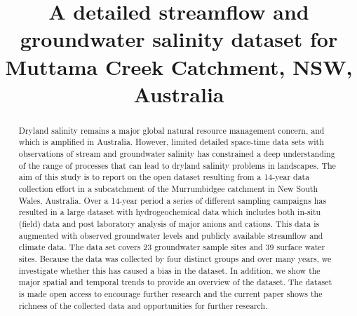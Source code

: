 \documentclass[, manuscript]{copernicus}
\begin{document}
\title{A detailed streamflow and groundwater salinity dataset for
Muttama Creek Catchment, NSW, Australia}











\received{}
\pubdiscuss{} %
\revised{}
\accepted{}
\published{}




\maketitle


\begin{abstract}
Dryland salinity remains a major global natural resource management
concern, and which is amplified in Australia. However, limited detailed
space-time data sets with observations of stream and groundwater
salinity has constrained a deep understanding of the range of processes
that can lead to dryland salinity problems in landscapes. The aim of
this study is to report on the open dataset resulting from a 14-year
data collection effort in a subcatchment of the Murrumbidgee catchment
in New South Wales, Australia. Over a 14-year period a series of
different sampling campaigns has resulted in a large dataset with
hydrogeochemical data which includes both in-situ (field) data and post
laboratory analysis of major anions and cations. This data is augmented
with observed groundwater levels and publicly available streamflow and
climate data. The data set covers 23 groundwater sample sites and 39
surface water sites. Because the data was collected by four distinct
groups and over many years, we investigate whether this has caused a
bias in the dataset. In addition, we show the major spatial and temporal
trends to provide an overview of the dataset. The dataset is made open
access to encourage further research and the current paper shows the
richness of the collected data and opportunities for further research.
\end{abstract}
\end{document}
